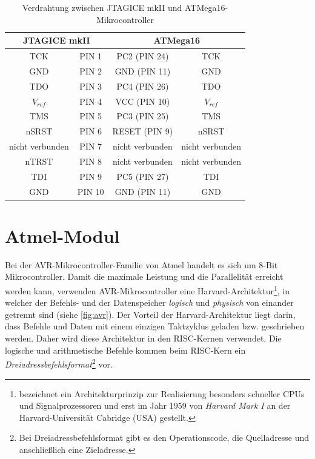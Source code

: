 \begin{table}[htbp]
\centering
\begin{tabular}{ |c|c|c|c| }
  \hline
  \multicolumn{2}{|c|}{\textbf{JTAGICE mkII}} & \multicolumn{2}{|c|}{\textbf{ATMega16}}\\ 
  \hline
  TCK & PIN 1& PC2 (PIN 24) & TCK \\
  GND & PIN 2 & GND (PIN 11) & GND \\
  TDO & PIN 3 & PC4 (PIN 26) & TDO \\
  $V_{ref}$ & PIN 4 & VCC (PIN 10) & $V_{ref}$ \\
  TMS & PIN 5 & PC3 (PIN 25) & TMS \\
  nSRST & PIN 6 & RESET (PIN 9) & nSRST \\
  nicht verbunden & PIN 7 & nicht verbunden & nicht verbunden \\
  nTRST & PIN 8 & nicht verbunden & nicht verbunden \\
  TDI & PIN 9 & PC5 (PIN 27) & TDI\\
  GND & PIN 10 & GND (PIN 11) & GND \\
  \hline
\end{tabular}
\caption{Verdrahtung zwischen JTAGICE mkII und ATMega16-Mikrocontroller}\label{fig:jtag_atmel}
\end{table}

\section{Atmel-Modul}\label{sec:atmel}

Bei der AVR-Mikrocontroller-Familie von Atmel \cite{Atmel} handelt es sich um 8-Bit Mikrocontroller. Damit die maximale Leistung und die Parallelität erreicht werden kann, verwenden AVR-Mikrocontroller eine Harvard-Architektur\footnote{bezeichnet ein Architekturprinzip zur Realisierung besonders schneller CPUs und Signalprozessoren und erst im Jahr 1959 von \textit{Harvard Mark I} an der Harvard-Universität Cabridge (USA) gestellt.}, in welcher der Befehls- und der Datenspeicher \textit{logisch} und \textit{physisch} von einander getrennt sind (siehe \autoref{fig:avr}). Der Vorteil der Harvard-Architektur liegt darin, dass Befehle und Daten mit einem einzigen Taktzyklus geladen bzw. geschrieben werden. Daher wird diese Architektur in den RISC-Kernen verwendet. Die logische und arithmetische Befehle kommen beim RISC-Kern ein \textit{Dreiadressbefehlsformat}\footnote{Bei Dreiadressbefehlsformat gibt es den Operationscode, die Quelladresse und anschließlich eine Zieladresse.} vor. \smallskip \smallskip

